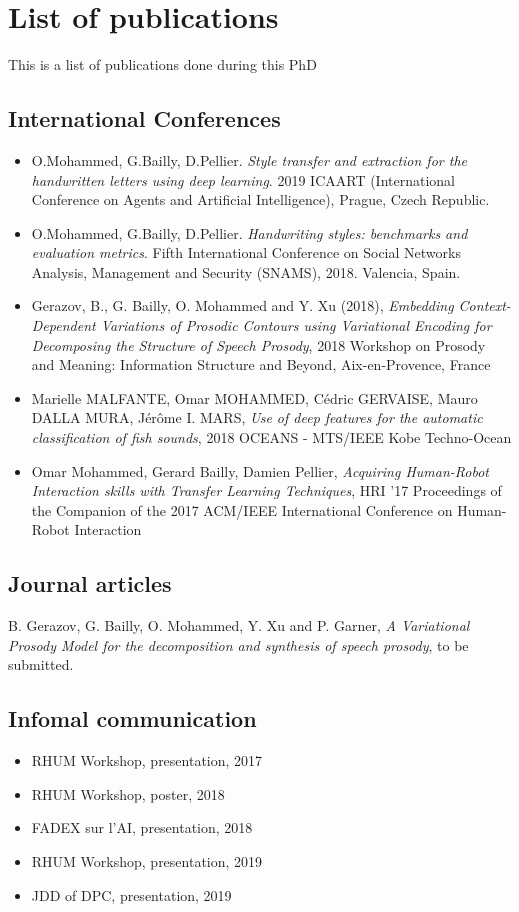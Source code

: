 \chapter{List of publications}
This is a list of publications done during this PhD

\section{International Conferences}

\begin{itemize}
  \item O.Mohammed, G.Bailly, D.Pellier. \textit{Style transfer and extraction for the handwritten letters using deep learning}. 2019 ICAART (International Conference on Agents and Artificial Intelligence), Prague, Czech Republic.
  \item O.Mohammed, G.Bailly, D.Pellier. \textit{Handwriting styles: benchmarks and evaluation metrics}. Fifth International Conference on Social Networks Analysis, Management and Security (SNAMS), 2018. Valencia, Spain.
  \item Gerazov, B., G. Bailly, O. Mohammed and Y. Xu (2018), \textit{Embedding Context-Dependent Variations of Prosodic Contours using Variational Encoding for Decomposing the Structure of Speech Prosody}, 2018 Workshop on Prosody and Meaning: Information Structure and Beyond, Aix-en-Provence, France
  \item Marielle MALFANTE, Omar MOHAMMED, Cédric GERVAISE, Mauro DALLA MURA, Jérôme I. MARS, \textit{Use of deep features for the automatic classification of fish sounds}, 2018 OCEANS - MTS/IEEE Kobe Techno-Ocean
  \item Omar Mohammed, Gerard Bailly, Damien Pellier, \textit{Acquiring Human-Robot Interaction skills with Transfer Learning Techniques}, HRI '17 Proceedings of the Companion of the 2017 ACM/IEEE International Conference on Human-Robot Interaction
\end{itemize}

\section{Journal articles}
\item B. Gerazov, G. Bailly, O. Mohammed, Y. Xu and P. Garner, \textit{A Variational Prosody Model for the decomposition and synthesis of speech prosody}, to be submitted.

\section{Infomal communication}
\begin{itemize}
  \item RHUM Workshop, presentation, 2017
  \item RHUM Workshop, poster, 2018
  \item FADEX sur l'AI, presentation, 2018
  \item RHUM Workshop, presentation, 2019
  \item JDD of DPC, presentation, 2019
\end{itemize}
